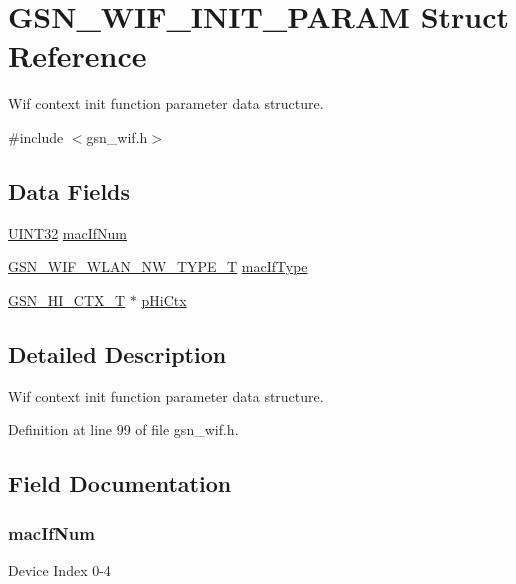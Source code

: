 \hypertarget{a00338}{
\section{GSN\_\-WIF\_\-INIT\_\-PARAM Struct Reference}
\label{a00338}
}


Wif context init function parameter data structure.  




{\ttfamily \#include $<$gsn\_\-wif.h$>$}

\subsection*{Data Fields}
\begin{DoxyCompactItemize}
\item 
\hyperlink{a00660_gae1e6edbbc26d6fbc71a90190d0266018}{UINT32} \hyperlink{a00338_aacea9b36a9084b16b483db4716bf7ea1}{macIfNum}
\item 
\hyperlink{a00677_gabc852e0cb262314c5f307a3e9802921e}{GSN\_\-WIF\_\-WLAN\_\-NW\_\-TYPE\_\-T} \hyperlink{a00338_a3ee37b79013f1da93271b12024198eed}{macIfType}
\item 
\hyperlink{a00085}{GSN\_\-HI\_\-CTX\_\-T} $\ast$ \hyperlink{a00338_ab671e23204d79f8fda7dba9992c3d6e9}{pHiCtx}
\end{DoxyCompactItemize}


\subsection{Detailed Description}
Wif context init function parameter data structure. 

Definition at line 99 of file gsn\_\-wif.h.



\subsection{Field Documentation}
\hypertarget{a00338_aacea9b36a9084b16b483db4716bf7ea1}{
\subsubsection[{macIfNum}]{ {\bf macIfNum}}}
\label{a00338_aacea9b36a9084b16b483db4716bf7ea1}
Device Index 0-\/4 

